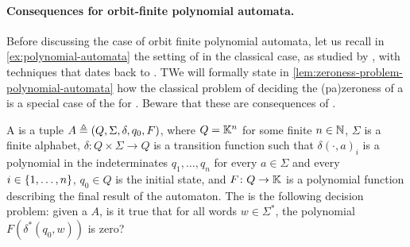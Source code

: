 \paragraph{Consequences for orbit-finite polynomial automata.} Before
discussing the case of orbit finite polynomial automata, let us recall in
\cref{ex:polynomial-automata}
the
setting of  in the classical case, as studied by
\cite{BEDUSHWO17}, with techniques that dates back to \cite{MULSEI02}.
TWe  will
formally state in \cref{lem:zeroness-problem-polynomial-automata}
how the classical problem of deciding the \kl(pa){zeroness} of a
 is a special case of the  for . Beware that
these are consequences of \cite{JGL10}.

\begin{definition}
  \label{ex:polynomial-automata}
  A  is a tuple $A \triangleq (Q, \Sigma, \delta, q_0, F)$,
  where $Q = \mathbb{K}^n$ for some finite $n \in \mathbb{N}$, $\Sigma$ is a finite alphabet,
  $\delta \colon Q \times \Sigma \to Q$ is a transition function such that 
  $\delta(\cdot,a)_i$ is a polynomial in the indeterminates $q_1, \dots, q_n$ for every
  $a \in \Sigma$ and every $i \in \{ 1, \dots, n \}$, $q_0 \in Q$ is the initial state,
  and $F \colon Q \to \mathbb{K}$ is a polynomial function describing the final result of the 
  automaton.
  The  is the following decision problem:
  given a  $A$, is it true that 
  for all words $w \in \Sigma^*$, the polynomial $F(\delta^*(q_0, w))$ is zero?
\end{definition}

